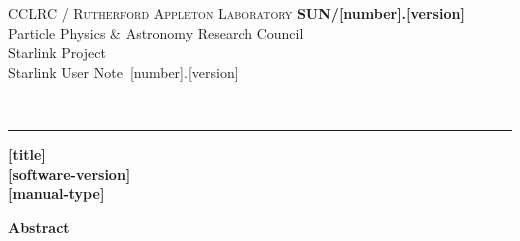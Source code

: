 \documentclass[twoside,11pt]{article}
\newcommand{\stardoccategory}  {Starlink User Note}
\newcommand{\stardocinitials}  {SUN}
\newcommand{\stardocnumber}    {[number].[version]}
\newcommand{\stardocauthors}   {[author]}
\newcommand{\stardocdate}      {[date]}
\newcommand{\stardoctitle}     {[title]}
\newcommand{\stardocversion}   {[software-version]}
\newcommand{\stardocmanual}    {[manual-type]}
\newcommand{\stardocname}{\stardocinitials /\stardocnumber}
\newenvironment{latexonly}{}{}
\renewcommand{\_}{\texttt{\symbol{95}}}
\begin{document}
\thispagestyle{empty}

\begin{latexonly}
   CCLRC / \textsc{Rutherford Appleton Laboratory} \hfill \textbf{\stardocname}\\
   {\large Particle Physics \& Astronomy Research Council}\\
   {\large Starlink Project\\}
   {\large \stardoccategory\ \stardocnumber}
   \begin{flushright}
   \stardocauthors\\
   \stardocdate
   \end{flushright}
   \vspace{-4mm}
   \rule{\textwidth}{0.5mm}
   \vspace{5mm}
   \begin{center}
   {\Huge\textbf{\stardoctitle \\ [2.5ex]}}
   {\LARGE\textbf{\stardocversion \\ [4ex]}}
   {\Huge\textbf{\stardocmanual}}
   \end{center}
   \vspace{5mm}


   \vspace{10mm}
   \begin{center}
      {\Large\textbf{Abstract}}
   \end{center}
\end{latexonly}
\end{document}
